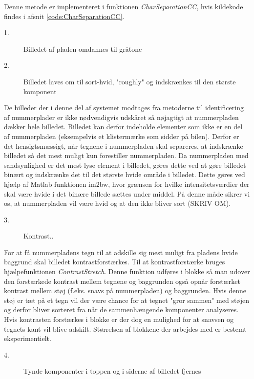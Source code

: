 Denne metode er implementeret i funktionen \textit{CharSeparationCC}, hvis kildekode findes i afsnit \vref{code:CharSeparationCC}.

\begin{description}
\item[1.] Billedet af pladen omdannes til gråtone
\item[2.] Billedet laves om til sort-hvid, "roughly" og indskrænkes til den største komponent
\end{description}
De billeder der i denne del af systemet modtages fra metoderne til identificering af nummerplader er ikke nødvendigvis udskåret så nøjagtigt at nummerpladen dækker hele billedet. Billedet kan derfor indeholde elementer som ikke er en del af nummerpladen (eksempelvis et klistermærke som sidder på bilen). Derfor er det hensigtsmæssigt, når tegnene i nummerpladen skal separeres, at indskrænke billedet så det mest muligt kun forestiller nummerpladen. Da nummerpladen med sandsynlighed er det mest lyse element i billedet, gøres dette ved at gøre billedet binært og indskrænke det til det største hvide område i billedet. Dette gøres ved hjælp af Matlab funktionen im2bw, hvor grænsen for hvilke intensitetsværdier der skal være hvide i det binære billede sættes under middel. På denne måde sikrer vi os, at nummerpladen vil være hvid og at den ikke bliver sort (SKRIV OM).

\begin{description}
\item[3.] Kontrast..
\end{description}



For at få nummerpladens tegn til at adskille sig mest muligt fra pladens hvide baggrund skal billedet kontrastforstærkes. Til at kontrastforstærke bruges hjælpefunktionen \textit{ContrastStretch}. Denne funktion udføres i blokke så man udover den forstærkede kontrast mellem tegnene og baggrunden også opnår forstærket kontrast mellem støj (f.eks. snavs på nummerpladen) og baggrunden. Hvis denne støj er tæt på et tegn vil der være chance for at tegnet "gror sammen" med støjen og derfor bliver sorteret fra når de sammenhængende komponenter analyseres. Hvis kontrasten forstærkes i blokke er der dog en mulighed for at snavsen og tegnets kant vil blive adskilt. Størrelsen af blokkene der arbejdes med er bestemt eksperimentielt.

\begin{description}
\item[4.] Tynde komponenter i toppen og i siderne af billedet fjernes
\end{description}

